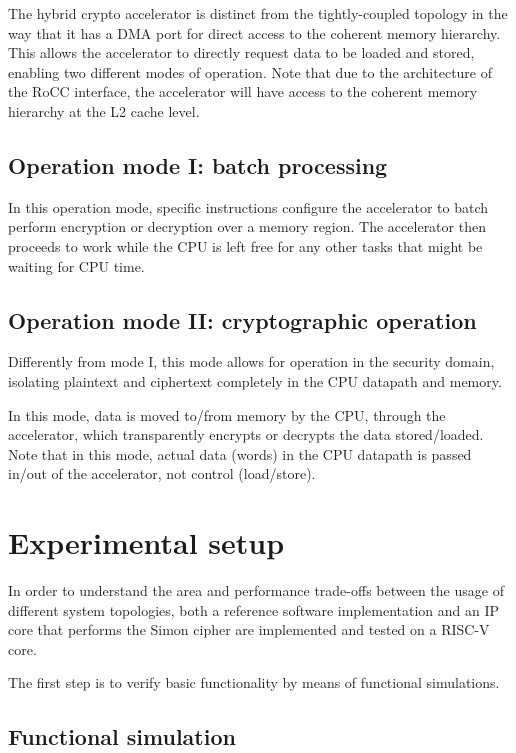 \documentclass[10pt,conference]{IEEEtran}
\begin{document}
The hybrid crypto accelerator is distinct from the tightly-coupled topology in
the way that it has a DMA port for direct access to the coherent memory
hierarchy. This allows the accelerator to directly request data to be loaded and
stored, enabling two different modes of operation. Note that due to the
architecture of the RoCC interface, the accelerator will have access to the
coherent memory hierarchy at the L2 cache level.

\subsection{Operation mode I: batch processing}

In this operation mode, specific instructions configure the accelerator to
batch perform encryption or decryption over a memory region. The accelerator
then proceeds to work while the CPU is left free for any other tasks that might
be waiting for CPU time.


\subsection{Operation mode II: cryptographic operation}

Differently from mode I, this mode allows for operation in the security domain,
isolating plaintext and ciphertext completely in the CPU datapath and memory.

In this mode, data is moved to/from memory by the CPU, through the accelerator,
which transparently encrypts or decrypts the data stored/loaded. Note that in
this mode, actual data (words) in the CPU datapath is passed in/out of the
accelerator, not control (load/store).

\section{Experimental setup}

In order to understand the area and performance trade-offs between the usage of
different system topologies, both a reference software implementation and an IP
core that performs the Simon cipher are implemented and tested on a RISC-V core.

The first step is to verify basic functionality by means of functional simulations.

\subsection{Functional simulation}
\end{document}

